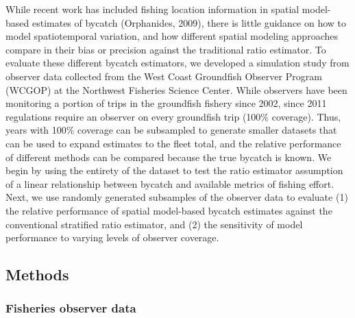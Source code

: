 \documentclass[]{article}
\begin{document}
While recent work has included fishing location information in spatial
model-based estimates of bycatch (Orphanides, 2009), there is little
guidance on how to model spatiotemporal variation, and how different
spatial modeling approaches compare in their bias or precision against
the traditional ratio estimator. To evaluate these different bycatch
estimators, we developed a simulation study from observer data collected
from the West Coast Groundfish Observer Program (WCGOP) at the Northwest
Fisheries Science Center. While observers have been monitoring a portion
of trips in the groundfish fishery since 2002, since 2011 regulations
require an observer on every groundfish trip (100\% coverage). Thus,
years with 100\% coverage can be subsampled to generate smaller datasets
that can be used to expand estimates to the fleet total, and the
relative performance of different methods can be compared because the
true bycatch is known. We begin by using the entirety of the dataset to
test the ratio estimator assumption of a linear relationship between
bycatch and available metrics of fishing effort. Next, we use randomly
generated subsamples of the observer data to evaluate (1) the relative
performance of spatial model-based bycatch estimates against the
conventional stratified ratio estimator, and (2) the sensitivity of
model performance to varying levels of observer coverage.

\subsection{Methods}\label{methods}

\subsubsection{Fisheries observer data}\label{fisheries-observer-data}
\end{document}
